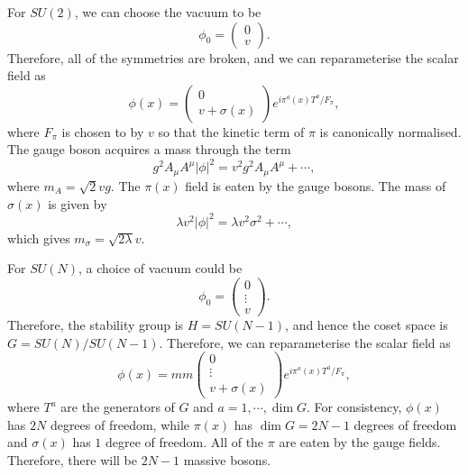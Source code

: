 \begin{solution}
    For $SU(2)$, we can choose the vacuum to be
    \begin{equation}
        \phi_0 = \begin{pmatrix}
            0 \\ v
        \end{pmatrix}.
    \end{equation}
    Therefore, all of the symmetries are broken, and we can reparameterise the scalar field as
    \begin{equation}
        \phi(x) = \begin{pmatrix}
            0 \\ v + \sigma(x)
        \end{pmatrix}e^{i\pi^a(x)T^a/ F_\pi},
    \end{equation}
    where $F_\pi $ is chosen to by $v$ so that the kinetic term of $\pi$ is canonically normalised. The gauge boson acquires a mass through the term
    \begin{equation}
        g^2A_\mu A^\mu |\phi|^2 = v^2g^2A_\mu A^\mu + \cdots,
    \end{equation}
    where $m_A = \sqrt{2}vg$. The $\pi(x)$ field is eaten by the gauge bosons. The mass of $\sigma(x)$ is given by
    \begin{equation}
        \lambda v^2 |\phi|^2 = \lambda v^2 \sigma^2 + \cdots,
    \end{equation}
    which gives $m_\sigma = \sqrt{2\lambda}v$.

    For $SU(N)$, a choice of vacuum could be
    \begin{equation}
        \phi_0 = \begin{pmatrix}
            0 \\ \vdots \\ v
        \end{pmatrix}.
    \end{equation}
    Therefore, the stability group is $H = SU(N-1)$, and hence the coset space is $G = SU(N) / SU(N-1)$. Therefore, we can reparameterise the scalar field as
        \begin{equation}
        \phi(x) = mm\begin{pmatrix}
            0 \\\vdots \\ v + \sigma(x)
        \end{pmatrix}e^{i\pi^a(x)T^a/ F_\pi},
    \end{equation}
    where $T^a$ are the generators of $G$ and $a = 1, \cdots , \dim G$. For consistency, $\phi(x)$ has $2N$ degrees of freedom, while $\pi(x)$ has $\dim G = 2N-1$ degrees of freedom and $\sigma(x)$ has $1$ degree of freedom. All of the $\pi$ are eaten by the gauge fields. Therefore, there will be $2N-1$ massive bosons.
\end{solution}

